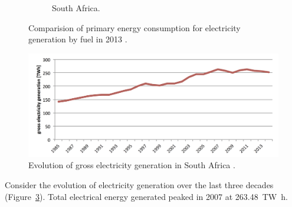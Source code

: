 \begin{figure}[!htbp]
\begin{subfigure}[b]{0.45\textwidth}
                \caption{South Africa.}\label{ElectrSA}
        \end{subfigure}
\caption[Comparision of primary energy consumption for electricity generation by fuel in 2013.]{Comparision of primary energy consumption for electricity generation by fuel in 2013 \cite{Agency2015}.}\label{Electr}
\end{figure}

\begin{figure}[htbp]  
\centering
\includegraphics[width=1\linewidth]{FIG/electrGross}
\caption[Evolution of gross electricity generation in South Africa.]{Evolution of gross electricity generation in South Africa \cite{BP2015c}.}\label{electrGross}
\end{figure}
Consider the evolution of electricity generation over the last three decades (Figure~\ref{electrGross}). Total electrical energy generated peaked in 2007 at \SI{263,48}{\tera\watt\hour}. \cite{BP2015c} 

